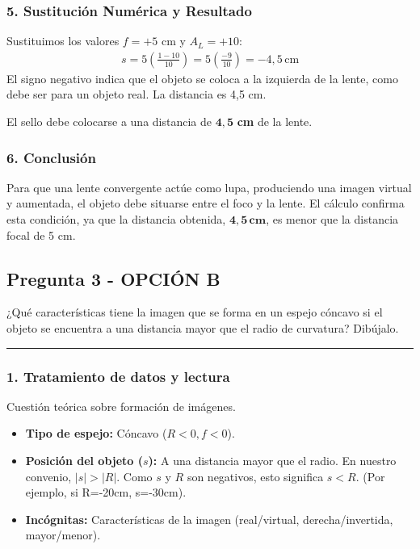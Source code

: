 \subsubsection*{5. Sustitución Numérica y Resultado}
Sustituimos los valores $f=+5$ cm y $A_L=+10$:
\begin{gather}
    s = 5 \left( \frac{1 - 10}{10} \right) = 5 \left( \frac{-9}{10} \right) = -4,5 \, \text{cm}
\end{gather}
El signo negativo indica que el objeto se coloca a la izquierda de la lente, como debe ser para un objeto real. La distancia es 4,5 cm.
\begin{cajaresultado}
    El sello debe colocarse a una distancia de $\boldsymbol{4,5}$ \textbf{cm} de la lente.
\end{cajaresultado}

\subsubsection*{6. Conclusión}
\begin{cajaconclusion}
Para que una lente convergente actúe como lupa, produciendo una imagen virtual y aumentada, el objeto debe situarse entre el foco y la lente. El cálculo confirma esta condición, ya que la distancia obtenida, $\mathbf{4,5 \, cm}$, es menor que la distancia focal de 5 cm.
\end{cajaconclusion}

\newpage

\subsection{Pregunta 3 - OPCIÓN B}
\label{subsec:3B_2003_jun_ord}

\begin{cajaenunciado}
¿Qué características tiene la imagen que se forma en un espejo cóncavo si el objeto se encuentra a una distancia mayor que el radio de curvatura? Dibújalo.
\end{cajaenunciado}
\hrule

\subsubsection*{1. Tratamiento de datos y lectura}
Cuestión teórica sobre formación de imágenes.
\begin{itemize}
    \item \textbf{Tipo de espejo:} Cóncavo ($R<0, f<0$).
    \item \textbf{Posición del objeto ($s$):} A una distancia mayor que el radio. En nuestro convenio, $|s| > |R|$. Como $s$ y $R$ son negativos, esto significa $s < R$. (Por ejemplo, si R=-20cm, s=-30cm).
    \item \textbf{Incógnitas:} Características de la imagen (real/virtual, derecha/invertida, mayor/menor).
\end{itemize}

